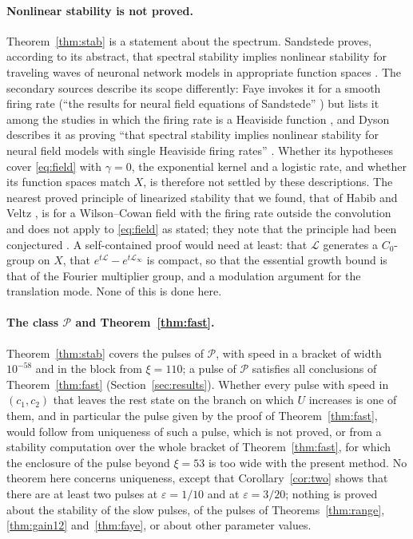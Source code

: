\documentclass[11pt]{article}
\theoremstyle{definition}
\newcommand{\eps}{\varepsilon}
\newcommand{\Lop}{\mathcal{L}}
\newcommand{\Pcl}{\mathcal{P}}
\begin{document}
\paragraph{Nonlinear stability is not proved.} Theorem~\ref{thm:stab} is a statement about the spectrum. Sandstede \cite{sandstede2007} proves, according to its abstract, that spectral stability implies nonlinear stability for traveling waves of neuronal network models in appropriate function spaces \cite[p.~2693]{sandstede2007}. The secondary sources describe its scope differently: Faye invokes it for a smooth firing rate (``the results for neural field equations of Sandstede'' \cite[p.~17 of the author's copy]{faye2013}) but lists it among the studies in which the firing rate is a Heaviside function \cite[p.~2]{faye2013}, and Dyson describes it as proving ``that spectral stability implies nonlinear stability for neural field models with single Heaviside firing rates'' \cite[p.~29]{dyson2018}. Whether its hypotheses cover \eqref{eq:field} with $\gamma = 0$, the exponential kernel and a logistic rate, and whether its function spaces match $X$, is therefore not settled by these descriptions. The nearest proved principle of linearized stability that we found, that of Habib and Veltz \cite[Theorem~1, p.~7]{hv2024}, is for a Wilson--Cowan field with the firing rate outside the convolution and does not apply to \eqref{eq:field} as stated; they note that the principle had been conjectured \cite[p.~2]{hv2024}. A self-contained proof would need at least: that $\Lop$ generates a $C_0$-group on $X$, that $e^{t\Lop} - e^{t\Lop_\infty}$ is compact, so that the essential growth bound is that of the Fourier multiplier group, and a modulation argument for the translation mode. None of this is done here.

\paragraph{The class $\Pcl$ and Theorem~\ref{thm:fast}.} Theorem~\ref{thm:stab} covers the pulses of $\Pcl$, with speed in a bracket of width $10^{-58}$ and in the block from $\xi = 110$; a pulse of $\Pcl$ satisfies all conclusions of Theorem~\ref{thm:fast} (Section~\ref{sec:results}). Whether every pulse with speed in $(c_1, c_2)$ that leaves the rest state on the branch on which $U$ increases is one of them, and in particular the pulse given by the proof of Theorem~\ref{thm:fast}, would follow from uniqueness of such a pulse, which is not proved, or from a stability computation over the whole bracket of Theorem~\ref{thm:fast}, for which the enclosure of the pulse beyond $\xi = 53$ is too wide with the present method. No theorem here concerns uniqueness, except that Corollary~\ref{cor:two} shows that there are at least two pulses at $\eps = 1/10$ and at $\eps = 3/20$; nothing is proved about the stability of the slow pulses, of the pulses of Theorems~\ref{thm:range}, \ref{thm:gain12} and~\ref{thm:faye}, or about other parameter values.
\end{document}
